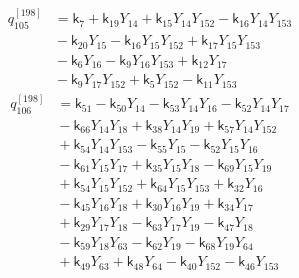 \begin{equation}\label{q198:row:105}
\begin{aligned}
q_{105}^{[198]} &={} \mathsf{k}_{7} + \mathsf{k}_{19}Y_{14} + \mathsf{k}_{15}Y_{14}Y_{152} - \mathsf{k}_{16}Y_{14}Y_{153}\\
&{} - \mathsf{k}_{20}Y_{15} - \mathsf{k}_{16}Y_{15}Y_{152} + \mathsf{k}_{17}Y_{15}Y_{153}\\
&{} - \mathsf{k}_{6}Y_{16} - \mathsf{k}_{9}Y_{16}Y_{153} + \mathsf{k}_{12}Y_{17}\\
&{} - \mathsf{k}_{9}Y_{17}Y_{152} + \mathsf{k}_{5}Y_{152} - \mathsf{k}_{11}Y_{153}
\end{aligned}
\end{equation}
\begin{equation}\label{q198:row:106}
\begin{aligned}
q_{106}^{[198]} &={} \mathsf{k}_{51} - \mathsf{k}_{50}Y_{14} - \mathsf{k}_{53}Y_{14}Y_{16} - \mathsf{k}_{52}Y_{14}Y_{17}\\
&{} - \mathsf{k}_{66}Y_{14}Y_{18} + \mathsf{k}_{38}Y_{14}Y_{19} + \mathsf{k}_{57}Y_{14}Y_{152}\\
&{} + \mathsf{k}_{54}Y_{14}Y_{153} - \mathsf{k}_{55}Y_{15} - \mathsf{k}_{52}Y_{15}Y_{16}\\
&{} - \mathsf{k}_{61}Y_{15}Y_{17} + \mathsf{k}_{35}Y_{15}Y_{18} - \mathsf{k}_{69}Y_{15}Y_{19}\\
&{} + \mathsf{k}_{54}Y_{15}Y_{152} + \mathsf{k}_{64}Y_{15}Y_{153} + \mathsf{k}_{32}Y_{16}\\
&{} - \mathsf{k}_{45}Y_{16}Y_{18} + \mathsf{k}_{30}Y_{16}Y_{19} + \mathsf{k}_{34}Y_{17}\\
&{} + \mathsf{k}_{29}Y_{17}Y_{18} - \mathsf{k}_{63}Y_{17}Y_{19} - \mathsf{k}_{47}Y_{18}\\
&{} - \mathsf{k}_{59}Y_{18}Y_{63} - \mathsf{k}_{62}Y_{19} - \mathsf{k}_{68}Y_{19}Y_{64}\\
&{} + \mathsf{k}_{49}Y_{63} + \mathsf{k}_{48}Y_{64} - \mathsf{k}_{40}Y_{152} - \mathsf{k}_{46}Y_{153}
\end{aligned}
\end{equation}
